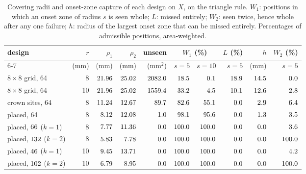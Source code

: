 \documentclass[11pt]{amsart}
\theoremstyle{definition}
\theoremstyle{remark}
\begin{document}
\begin{table}[t]
\centering\small
\caption{Covering radii and onset-zone capture of each design on $X$, on the
triangle rule. $W_1$: positions in which an onset zone of radius $s$ is seen
whole; $L$: missed entirely; $W_2$: seen twice, hence whole after any one
failure; $h$: radius of the largest onset zone that can be missed entirely.
Percentages of admissible positions, area-weighted.}
\label{tab:capture}
\setlength{\tabcolsep}{4pt}
\begin{tabular}{lrrrrrrrrr}
\toprule
design & $r$ & $\rho_1$ & $\rho_2$ & unseen & \multicolumn{2}{c}{$W_1$ (\%)} & $L$ (\%) & $h$ & $W_2$ (\%)\\
\cmidrule(lr){6-7}
 & (mm) & (mm) & (mm) & (mm$^2$) & $s=5$ & $s=10$ & $s=5$ & (mm) & $s=5$\\
\midrule
$8\times8$ grid, 64 & 8 & $21.96$ & $25.02$ & $2082.0$ & $18.5$ & $0.1$ & $18.9$ & $14.5$ & $0.0$\\
$8\times8$ grid, 64 & 10 & $21.96$ & $25.02$ & $1559.4$ & $33.2$ & $4.5$ & $10.1$ & $12.6$ & $2.8$\\
crown sites, 64 & 8 & $11.24$ & $12.67$ & $89.7$ & $82.6$ & $55.1$ & $0.0$ & $2.9$ & $6.4$\\
placed, 64 & 8 & $8.12$ & $12.08$ & $1.0$ & $98.1$ & $95.6$ & $0.0$ & $1.3$ & $3.5$\\
placed, $66$ ($k=1$) & 8 & $7.77$ & $11.36$ & $0.0$ & $100.0$ & $100.0$ & $0.0$ & $0.0$ & $3.6$\\
placed, $132$ ($k=2$) & 8 & $5.83$ & $7.78$ & $0.0$ & $100.0$ & $100.0$ & $0.0$ & $0.0$ & $100.0$\\
placed, $46$ ($k=1$) & 10 & $9.45$ & $13.71$ & $0.0$ & $100.0$ & $100.0$ & $0.0$ & $0.0$ & $4.2$\\
placed, $102$ ($k=2$) & 10 & $6.79$ & $8.95$ & $0.0$ & $100.0$ & $100.0$ & $0.0$ & $0.0$ & $100.0$\\
\bottomrule
\end{tabular}
\end{table}
\end{document}
